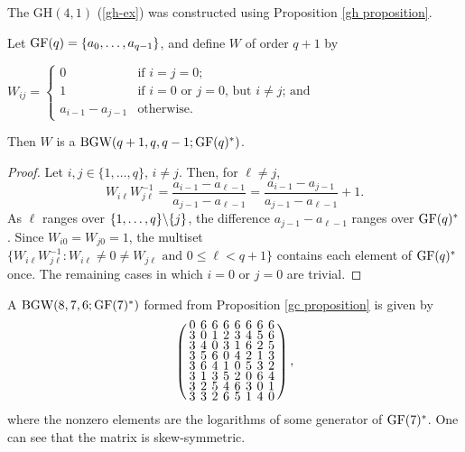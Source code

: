 \documentclass[../../../main]{subfiles}
\begin{document}
 \begin{ex}
  The GH$(4,1)$ (\ref{gh-ex}) was constructed using Proposition \ref{gh proposition}.
 \end{ex}
 
 \begin{prop}\label{gc proposition}
  Let $\text{GF}(q) = \{a_0, \dots, a_{q-1}\}$, and define $W$ of order $q+1$ by
  \begin{defenum}
  \item $W_{ij} = \begin{cases}
            0 & \text{if } i = j = 0; \\
            1 & \text{if } i = 0 \text{ or } j = 0 \text{, but } i \neq j \text{; and} \\
            a_{i-1} - a_{j-1} & \text{otherwise.}
           \end{cases}$
  \end{defenum}
  Then $W$ is a $\text{BGW}(q+1,q,q-1; \text{GF}(q)^*)$.
 \end{prop}
 
 \begin{proof}
  Let $i,j \in \{1, \dots, q\}$, $i \neq j$. Then, for $\ell \neq j$,
  \[
  W_{i\ell}W_{j\ell}^{-1} = \frac{a_{i-1} - a_{\ell-1}}{a_{j-1} - a_{\ell-1}} = \frac{a_{i-1} - a_{j-1}}{a_{j-1} - a_{\ell-1}} + 1.
  \]
  As $\ell$ ranges over $\{1,\dots,q\}\backslash\{j\}$, the difference $a_{j-1} - a_{\ell-1}$ ranges over $\text{GF}(q)^*$. Since $W_{i0} = W_{j0} = 1$, the multiset $\{W_{i\ell}W_{j\ell}^{-1} : W_{i\ell} \neq 0 \neq W_{j\ell} \text{ and } 0 \leq \ell < q+1\}$ contains each element of $\text{GF}(q)^*$ once. The remaining cases in which $i = 0$ or $j = 0$ are trivial.
 \end{proof}
 
 \begin{ex}
  A $\text{BGW}(8,7,6; \text{GF}(7)^*)$ formed from Proposition \ref{gc proposition} is given by
  \begin{equation}
  \arraycolsep=2.0pt\def\arraystretch{0.5}
  \left(
  \begin{array}{cccccccc}
0&6&6&6&6&6&6&6\\
3&0&1&2&3&4&5&6\\
3&4&0&3&1&6&2&5\\
3&5&6&0&4&2&1&3\\
3&6&4&1&0&5&3&2\\
3&1&3&5&2&0&6&4\\
3&2&5&4&6&3&0&1\\
3&3&2&6&5&1&4&0\\
\end{array}
\right),
  \end{equation}
  where the nonzero elements are the logarithms of some generator of $\text{GF}(7)^*$. One can see that the matrix is skew-symmetric.
 \end{ex}
 
\end{document}
